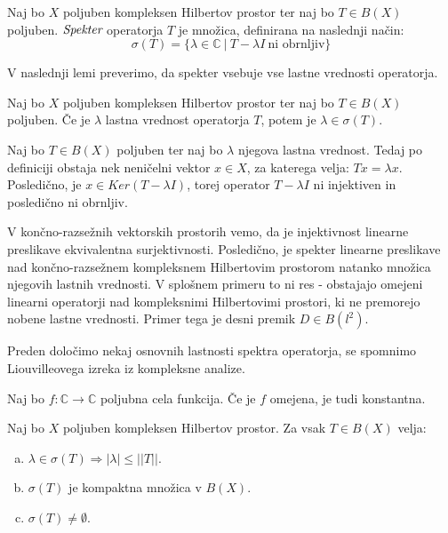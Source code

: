 \documentclass[mat2]{matdelo}
\newcommand{\C}{\mathbb{C}}
\newcommand{\abs}[1]{\ensuremath{\lvert #1 \rvert}}
\newcommand{\norm}[1]{\abs{\abs{#1}}}
\newcommand{\pojem}[1]{\ensuremath{\emph{#1}}}
\newcommand{\map}[3]{\ensuremath{{#1}:{#2}\rightarrow{#3}}}
\begin{document}
		\begin{definicija}
			\label{def:specter}
			Naj bo $X$ poljuben kompleksen Hilbertov prostor ter naj bo $T\in B(X)$ poljuben. \pojem{Spekter} operatorja $T$ je množica, definirana na naslednji način: $$\sigma(T) = \{\lambda\in\C~|~T-\lambda I~\text{ni obrnljiv}\}$$
		\end{definicija}
		
		V naslednji lemi preverimo, da spekter vsebuje vse lastne vrednosti operatorja.
		
		\begin{lema}
			\label{lem:eigeninspecter}
			Naj bo $X$ poljuben kompleksen Hilbertov prostor ter naj bo $T\in B(X)$ poljuben. Če je $\lambda$ lastna vrednost operatorja $T$, potem je $\lambda\in\sigma(T)$.
		\end{lema}
		
		\begin{dokaz}
			Naj bo $T\in B(X)$ poljuben ter naj bo $\lambda$ njegova lastna vrednost. Tedaj po definiciji obstaja nek neničelni vektor $x\in X$, za katerega velja: $Tx = \lambda x$. Posledično, je $x\in Ker(T-\lambda I)$, torej operator $T - \lambda I$ ni injektiven in posledično ni obrnljiv.
		\end{dokaz}
		
		\begin{opomba}
			\label{opomb:eigeninspecter}
			V končno-razsežnih vektorskih prostorih vemo, da je injektivnost linearne preslikave ekvivalentna surjektivnosti. Posledično, je spekter linearne preslikave nad končno-razsežnem kompleksnem Hilbertovim prostorom natanko množica njegovih lastnih vrednosti. V splošnem primeru to ni res - obstajajo omejeni linearni operatorji nad kompleksnimi Hilbertovimi prostori, ki ne premorejo nobene lastne vrednosti. Primer tega je desni premik $D\in B(l^2)$.
		\end{opomba}
		
		Preden določimo nekaj osnovnih lastnosti spektra operatorja, se spomnimo Liouvilleovega izreka iz kompleksne analize.
		
		\begin{izrek}
			\label{izr:Liouville}
			Naj bo $\map{f}{\C}{\C}$ poljubna cela funkcija. Če je $f$ omejena, je tudi konstantna.
		\end{izrek}
		
		\begin{izrek}
			\label{izr:specter}
			Naj bo $X$ poljuben kompleksen Hilbertov prostor. Za vsak $T\in B(X)$ velja: \begin{enumerate}[a)]
				\item $\lambda\in\sigma(T) \Rightarrow \abs{\lambda}\leq\norm{T}$.
				\item $\sigma(T)$ je kompaktna množica v $B(X)$.
				\item $\sigma(T)\neq \emptyset$.
			\end{enumerate}
		\end{izrek}
		
\end{document}
